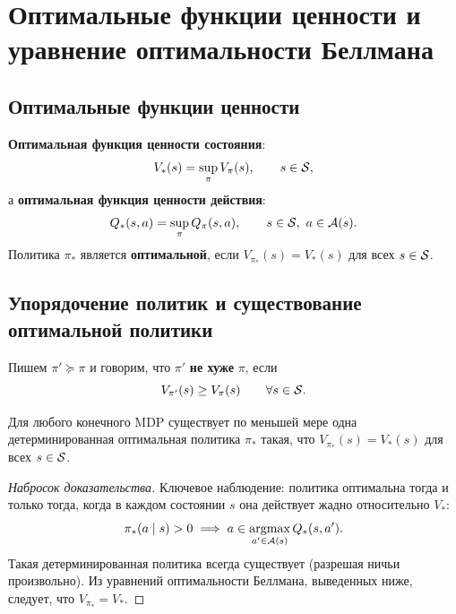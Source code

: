 \section{Оптимальные функции ценности и уравнение оптимальности Беллмана}
\label{sec:bellman-optimality}

\subsection*{Оптимальные функции ценности}

\begin{definition}
\label{def:optimal-value}
\textbf{Оптимальная функция ценности состояния}:
\begin{equation}
\label{eq:v-star}
V_*(s) = \sup_\pi V_\pi(s), \qquad s \in \mathcal{S},
\end{equation}
а \textbf{оптимальная функция ценности действия}:
\begin{equation}
\label{eq:q-star}
Q_*(s, a) = \sup_\pi Q_\pi(s, a), \qquad s \in \mathcal{S},\ a \in \mathcal{A}(s).
\end{equation}
Политика $\pi_*$ является \textbf{оптимальной}, если $V_{\pi_*}(s) = V_*(s)$ для всех $s \in \mathcal{S}$.
\end{definition}

\subsection*{Упорядочение политик и существование оптимальной политики}

\begin{definition}
\label{def:policy-ordering}
Пишем $\pi' \succeq \pi$ и говорим, что $\pi'$ \textbf{не хуже} $\pi$, если
\[
V_{\pi'}(s) \ge V_\pi(s) \qquad \forall s \in \mathcal{S}.
\]
\end{definition}

\begin{theorem}
\label{thm:optimal-policy-exists}
Для любого конечного MDP существует по меньшей мере одна детерминированная оптимальная политика $\pi_*$ такая, что $V_{\pi_*}(s) = V_*(s)$ для всех $s \in \mathcal{S}$.
\end{theorem}

\begin{proof}[Набросок доказательства]
Ключевое наблюдение: политика оптимальна тогда и только тогда, когда в каждом состоянии $s$ она действует жадно относительно $V_*$:
\[
\pi_*(a \mid s) > 0 \implies a \in \operatorname*{argmax}_{a' \in \mathcal{A}(s)} Q_*(s, a').
\]
Такая детерминированная политика всегда существует (разрешая ничьи произвольно). Из уравнений оптимальности Беллмана, выведенных ниже, следует, что $V_{\pi_*} = V_*$.
\end{proof}


